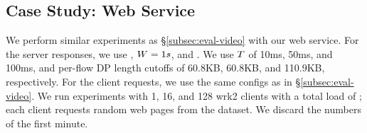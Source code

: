 \subsection{Case Study: Web Service}\label{subsec:eval-web}
%
%
We perform similar experiments as \S\ref{subsec:eval-video} with our web
service. For the server responses, we use , $W =
1s$, and . We use $T$ of {10ms, 50ms, and
100ms}, and per-flow DP length cutoffs of 60.8KB, 60.8KB, and 110.9KB,
respectively.
For the client requests, we use the same configs as in
\S\ref{subsec:eval-video}. We run  experiments with 1, 16, and 128
wrk2 clients with a total load of ;
each client requests random web pages from the dataset. We discard the numbers
of the first minute.

